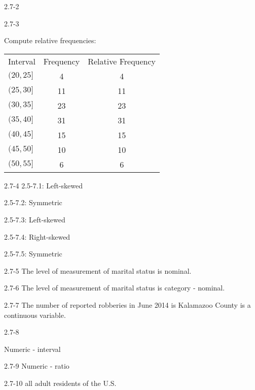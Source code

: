 \begin{exsol@solution}{2.7-2}

\end{exsol@solution}
\begin{exsol@solution}{2.7-3}

Compute relative frequencies:

\begin{tabular}{@{} lcc @{}} \hline
Interval  &  Frequency &	Relative Frequency \\
$(20, 25]$ 	&     4 & 4  \\
$(25, 30]$ 	&    11 & 11 \\
$(30, 35]$ 	&    23 & 23 \\
$(35, 40]$ 	&    31 & 31 \\
$(40, 45]$ 	&    15 & 15 \\
$(45, 50]$ 	&    10 & 10 \\
$(50, 55]$ 	&     6 & 6 \\ \hline
\end{tabular}


\end{exsol@solution}
\begin{exsol@solution}{2.7-4}
2.5-7.1: Left-skewed

2.5-7.2: Symmetric

2.5-7.3: Left-skewed

2.5-7.4: Right-skewed

2.5-7.5: Symmetric

\end{exsol@solution}
\begin{exsol@solution}{2.7-5}
	  The level of measurement of marital status is nominal.
\end{exsol@solution}
\begin{exsol@solution}{2.7-6}
	  The level of measurement of marital status is category - nominal.
\end{exsol@solution}
\begin{exsol@solution}{2.7-7}
	  The number of reported robberies in June 2014 is Kalamazoo County is a continuous variable.
\end{exsol@solution}
\begin{exsol@solution}{2.7-8}

    Numeric - interval

\end{exsol@solution}
\begin{exsol@solution}{2.7-9}
    Numeric - ratio
\end{exsol@solution}
\begin{exsol@solution}{2.7-10}
    all adult residents of the U.S.
\end{exsol@solution}
